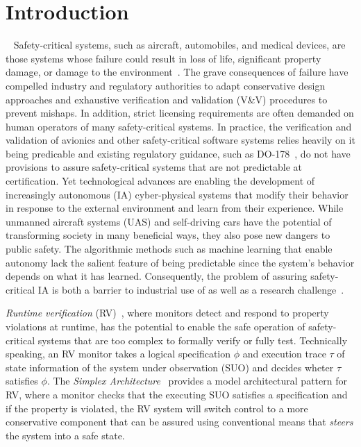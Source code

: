 \section{Introduction}~\label{sec:intro} 
Safety-critical systems, such as aircraft, automobiles, and medical
devices, are those systems whose failure could result
in loss of life, significant property damage, or damage to the
environment~\cite{Knight2002}.  The  grave consequences of failure have compelled
industry and regulatory authorities  to adapt conservative design
approaches and exhaustive verification and validation (V\&V) procedures
to prevent mishaps. In addition, strict licensing requirements are
often demanded on human operators of  many safety-critical systems.
In practice, the verification and validation of avionics
and other safety-critical software systems relies heavily on it being
predicable and existing regulatory guidance,  such as
DO-178~\cite{DO178B},  do not  have provisions to
assure safety-critical systems that are not predictable at certification. 
Yet technological advances are enabling the development of increasingly
autonomous (IA) cyber-physical  systems that modify their behavior in response
to the external environment and learn from their experience.  While
unmanned aircraft systems (UAS) and self-driving cars have the
potential of transforming society in many beneficial ways, they also
pose new dangers to public safety. The algorithmic methods such as
machine learning that enable autonomy lack the salient feature of
being predictable since the system's behavior depends on what it has
learned.  Consequently, the  problem  of assuring safety-critical IA is
both a barrier to industrial use of  as well as a research challenge~\cite{NRC14}.


\emph{Runtime verification} (RV)~\cite{monitors}, where monitors
detect and respond to property violations at runtime, has the
potential to enable the safe operation of safety-critical systems that
are too complex to formally verify or fully test.  Technically
speaking, an RV monitor takes a logical specification $\phi$ and
execution trace $\tau$ of state information of the system under
observation (SUO) and decides wheter $\tau$ satisfies $\phi$. The
\emph{Simplex Architecture}~\cite{simplex} provides a model
architectural pattern for RV, where a monitor checks that the
executing SUO satisfies a specification and if the property is
violated, the RV system will switch control to a more conservative
component that can be assured using conventional means that
\emph{steers} the system into a safe state.

